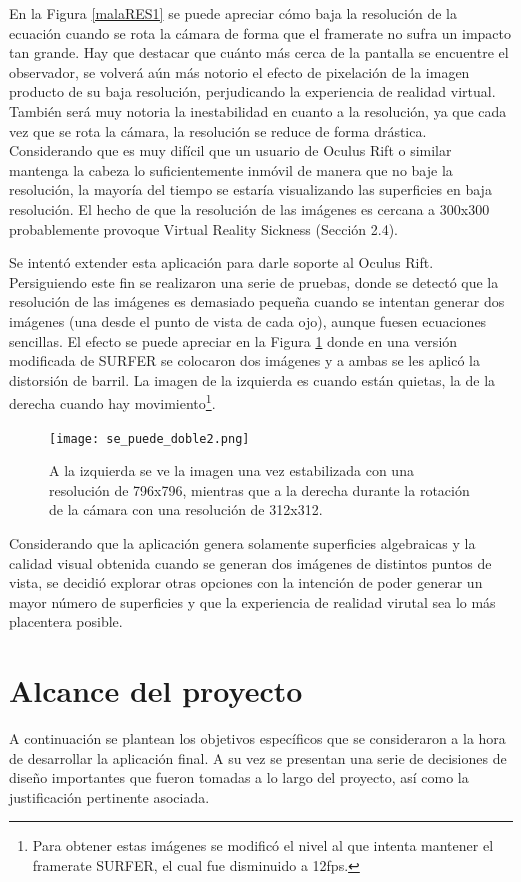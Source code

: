 \documentclass[12pt]{article}
\begin{document}
En la Figura \ref{malaRES1} se puede apreciar cómo baja la resolución de la ecuación cuando se rota la cámara de forma  que el framerate no sufra un impacto tan grande. Hay que destacar que cuánto más cerca de la pantalla se encuentre el observador, se volverá aún más notorio el efecto de pixelación de la imagen producto de su baja resolución, perjudicando la experiencia de realidad virtual. También será muy notoria la inestabilidad en cuanto a la resolución, ya que cada vez que se rota la cámara, la resolución se reduce de forma drástica. Considerando que es muy difícil que un  usuario de Oculus Rift o similar mantenga la cabeza lo suficientemente inmóvil de manera que no baje la resolución, la mayoría del tiempo se estaría visualizando las superficies en baja resolución. El hecho de que la resolución de las imágenes es cercana a 300x300 probablemente provoque Virtual Reality Sickness (Sección 2.4).

Se intentó extender esta aplicación para darle soporte al Oculus Rift. Persiguiendo este fin se realizaron una serie de pruebas, donde se detectó que la resolución de las imágenes es demasiado pequeña cuando se intentan generar dos imágenes (una desde el punto de vista de cada ojo), aunque fuesen ecuaciones sencillas. El efecto se puede apreciar en la Figura \ref{malaRES2} donde en una versión modificada de SURFER se colocaron dos imágenes y a ambas se les aplicó la distorsión de barril. La imagen de la izquierda es cuando están quietas, la de la derecha cuando hay movimiento\footnote{Para obtener estas imágenes se modificó el nivel al que intenta mantener el framerate SURFER, el cual fue disminuido a 12fps.}.
\clearpage
\begin{figure}[h!]
\texttt{[image: se\_puede\_doble2.png]}
\caption{A la izquierda se ve la imagen una vez estabilizada con una resolución de 796x796, mientras que a la derecha durante la rotación de la cámara con una resolución de 312x312.}
\label{malaRES2}
\end{figure}
Considerando que la aplicación genera solamente superficies algebraicas y la calidad visual obtenida cuando se generan dos imágenes de distintos puntos de vista, se decidió explorar otras opciones con la intención de poder generar un mayor número de superficies y que la experiencia de realidad virutal sea lo más placentera posible.
\clearpage
\section{Alcance del proyecto}
\noindent A continuación se plantean los objetivos específicos que se consideraron a la hora de desarrollar la aplicación final. A su vez se presentan una serie de decisiones de diseño importantes que fueron tomadas a lo largo del proyecto, así como la justificación pertinente asociada.
\end{document}
